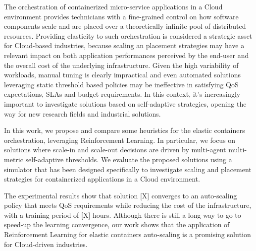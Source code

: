 The orchestration of containerized micro-service applications in a Cloud environment provides technicians with a fine-grained control on how software components scale and are placed over a theoretically infinite pool of distributed resources.
Providing elasticity to such orchestration is considered a strategic asset for Cloud-based industries, because scaling an placement strategies may have a relevant impact on both application performances perceived by the end-user and the overall cost of the underlying infrastructure.
%
Given the high variability of workloads, manual tuning is clearly impractical and even automated solutions leveraging static threshold based policies may be ineffective in satisfying QoS expectations, SLAs and budget requirements.
In this context, it's increasingly important to investigate solutions based on self-adaptive strategies, opening the way for new research fields and industrial solutions.

In this work, we propose and compare some heuristics for the elastic containers orchestration, leveraging Reinforcement Learning.
%
In particular, we focus on solutions where scale-in and scale-out decisions are driven by multi-agent multi-metric self-adaptive thresholds.
%
We evaluate the proposed solutions using a simulator that has been designed specifically to investigate scaling and placement strategies for containerized applications in a Cloud environment.

%
%
The experimental results show that solution [X] converges to an auto-scaling policy that meets QoS requirements while reducing the cost of the infrastructure, with a training period of [X] hours.
%
%
Although there is still a long way to go to speed-up the learning convergence, our work shows that the application of Reinforcement Learning for elastic containers auto-scaling is a promising solution for Cloud-driven industries.
